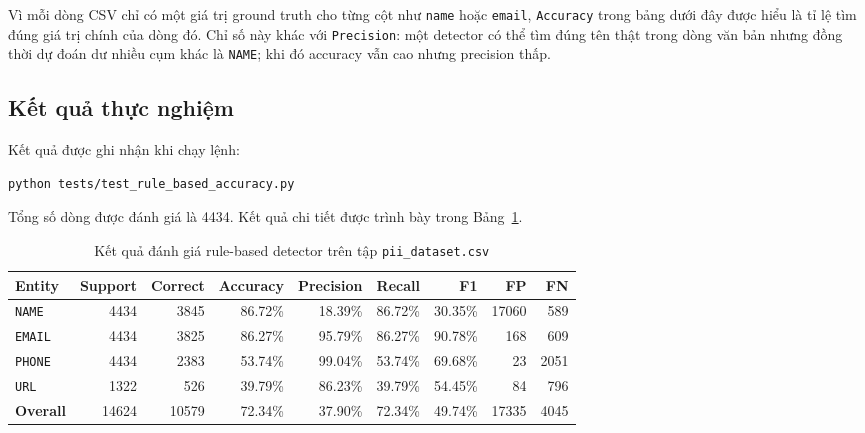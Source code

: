 Vì mỗi dòng CSV chỉ có một giá trị ground truth cho từng cột như \texttt{name}
hoặc \texttt{email}, \texttt{Accuracy} trong bảng dưới đây được hiểu là tỉ lệ
tìm đúng giá trị chính của dòng đó. Chỉ số này khác với \texttt{Precision}: một
detector có thể tìm đúng tên thật trong dòng văn bản nhưng đồng thời dự đoán dư
nhiều cụm khác là \texttt{NAME}; khi đó accuracy vẫn cao nhưng precision thấp.

\subsection{Kết quả thực nghiệm}

Kết quả được ghi nhận khi chạy lệnh:

\begin{verbatim}
python tests/test_rule_based_accuracy.py
\end{verbatim}

Tổng số dòng được đánh giá là 4434. Kết quả chi tiết được trình bày trong
Bảng~\ref{tab:rule_based_accuracy}.

\begin{table}[H]
    \centering
    \caption{Kết quả đánh giá rule-based detector trên tập \texttt{pii\_dataset.csv}}
    \label{tab:rule_based_accuracy}
    \renewcommand{\arraystretch}{1.25}
    \begin{adjustbox}{max width=\textwidth}
        \begin{tabular}{lrrrrrrrr}
            \toprule
            \textbf{Entity}  & \textbf{Support}   & \textbf{Correct} & \textbf{Accuracy}
                             & \textbf{Precision} & \textbf{Recall}  & \textbf{F1}
                             & \textbf{FP}        & \textbf{FN}                                                                       \\
            \midrule
            \texttt{NAME}    & 4434               & 3845             & 86.72\%           & 18.39\% & 86.72\% & 30.35\% & 17060 & 589  \\
            \texttt{EMAIL}   & 4434               & 3825             & 86.27\%           & 95.79\% & 86.27\% & 90.78\% & 168   & 609  \\
            \texttt{PHONE}   & 4434               & 2383             & 53.74\%           & 99.04\% & 53.74\% & 69.68\% & 23    & 2051 \\
            \texttt{URL}     & 1322               & 526              & 39.79\%           & 86.23\% & 39.79\% & 54.45\% & 84    & 796  \\
            \midrule
            \textbf{Overall} & 14624              & 10579            & 72.34\%           & 37.90\% & 72.34\% & 49.74\% & 17335 & 4045 \\
            \bottomrule
        \end{tabular}
    \end{adjustbox}
\end{table}

